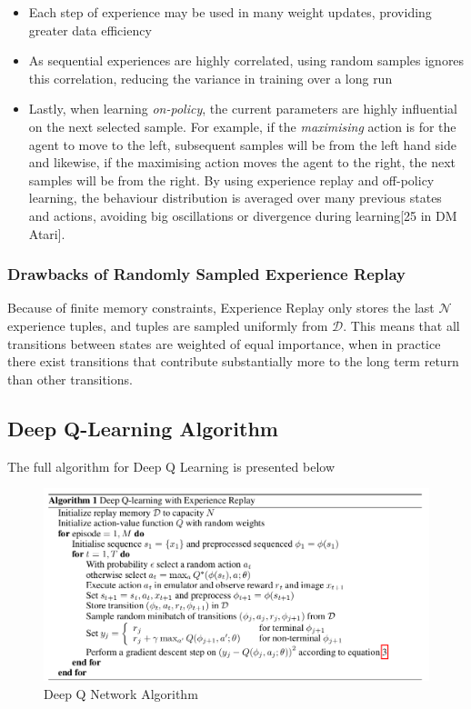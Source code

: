 \documentclass{article}
\begin{document}
\begin{itemize}
    \item Each step of experience may be used in many weight updates, providing greater data efficiency
    
    \item As sequential experiences are highly correlated, using random samples ignores this correlation, reducing the variance in training over a long run
    
    \item Lastly, when learning \textit{on-policy}, the current parameters are highly influential on the next selected sample. For example, if the \textit{maximising} action is for the agent to move to the left, subsequent samples will be from the left hand side and likewise, if the maximising action moves the agent to the right, the next samples will be from the right. By using experience replay and off-policy learning, the behaviour distribution is averaged over many previous states and actions, avoiding big oscillations or divergence during learning[25 in DM Atari]. 
\end{itemize}

\subsubsection{Drawbacks of Randomly Sampled Experience Replay}

Because of finite memory constraints, Experience Replay only stores the last $\mathcal{N}$ experience tuples, and tuples are sampled uniformly from $\mathcal{D}$. This means that all transitions between states are weighted of equal importance, when in practice there exist transitions that contribute substantially more to the long term return than other transitions. 

\subsection{Deep Q-Learning Algorithm}

The full algorithm for Deep Q Learning is presented below

\begin{figure}[H]
    \centering
    \includegraphics[scale=0.4]{images/DQN_DeepMind_Alg.png}
    \caption{Deep Q Network Algorithm \cite{mnih2013atari}}
    \label{fig:dqn_alg}
\end{figure}
\end{document}
